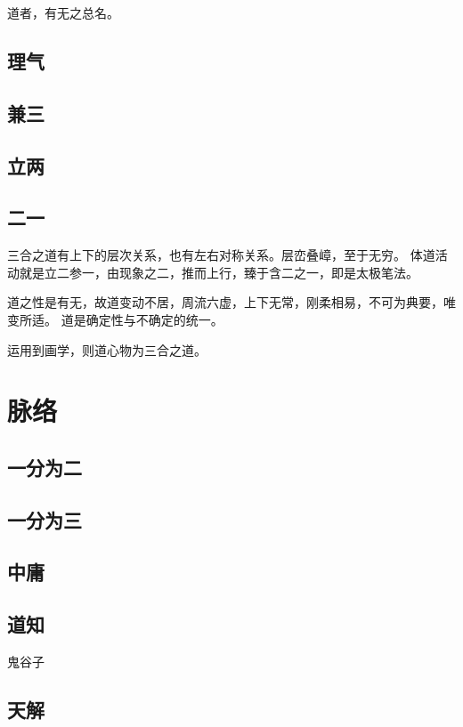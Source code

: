 道者，有无之总名。

\subsection{理气}

\subsection{兼三}

\subsection{立两}

\subsection{二一}

三合之道有上下的层次关系，也有左右对称关系。层峦叠嶂，至于无穷。
体道活动就是立二参一，由现象之二，推而上行，臻于含二之一，即是太极笔法。

道之性是有无，故道变动不居，周流六虚，上下无常，刚柔相易，不可为典要，唯变所适。
道是确定性与不确定的统一。

运用到画学，则道心物为三合之道。

\section{脉络}

\subsection{一分为二}

\subsection{一分为三}

\subsection{中庸}

\subsection{道知}

鬼谷子

\subsection{天解}

